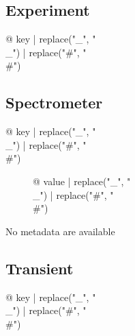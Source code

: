 \begin{multicols}{2}
\subsection{Experiment}

\begin{description}
\item[{@ key | replace("_", "\\_") | replace("#", "\\#") }] %
\end{description}

\subsection{Spectrometer}

\begin{description}
\item[{@ key | replace("_", "\\_") | replace("#", "\\#") }] {@ value | replace("_", "\\_") | replace("#", "\\#") }
\end{description}
No metadata are available

\subsection{Transient}

\begin{description}
\item[{@ key | replace("_", "\\_") | replace("#", "\\#") }] %
\end{description}


\end{multicols}
